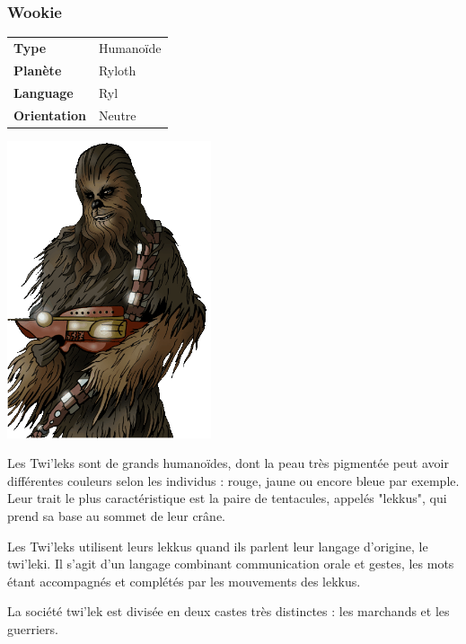 \subsubsection{Wookie}
\begin{samepage}
	\begin{flushright}
		\begin{tabular}{ l l }
			\textbf{Type} 			& Humanoïde \\
		   	\textbf{Planète} 		& Ryloth \\
		   	\textbf{Language} 		& Ryl \\
		   	\textbf{Orientation} 	& Neutre \\
		\end{tabular}
	\end{flushright}
	\vspace{-6\baselineskip}
	\includegraphics[width=6cm]{img/races/wookie.png}
\end{samepage}

Les Twi'leks sont de grands humanoïdes, dont la peau très pigmentée peut avoir différentes couleurs selon les individus : rouge, jaune ou encore bleue par exemple. Leur trait le plus caractéristique est la paire de tentacules, appelés "lekkus", qui prend sa base au sommet de leur crâne.

Les Twi'leks utilisent leurs lekkus quand ils parlent leur langage d'origine, le twi'leki. Il s'agit d'un langage combinant communication orale et gestes, les mots étant accompagnés et complétés par les mouvements des lekkus.

La société twi'lek est divisée en deux castes très distinctes : les marchands et les guerriers.


